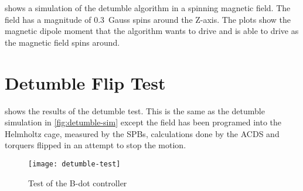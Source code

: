  shows a simulation of the detumble algorithm in a spinning magnetic field. The field has a magnitude of 0.3~Gauss spins around the Z-axis. The plots show the magnetic dipole moment that the algorithm wants to drive and is able to drive as the magnetic field spins around.


\section{Detumble Flip Test}

 shows the results of the detumble test. This is the same as the detumble simulation in \cref{fig:detumble-sim} except the field has been programed into the Helmholtz cage, measured by the \acp{SPB}, calculations done by the \ac{ACDS} and torquers flipped in an attempt to stop the motion.

\begin{figure}[!ht]
    \centering
    \texttt{[image: detumble-test]}
  \caption{Test of the B-dot controller}
    \label{fig:detumble-test}
\end{figure}



